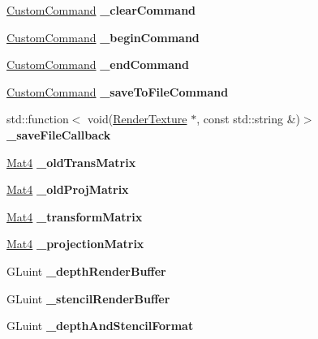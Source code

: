 \begin{DoxyCompactItemize}
\hyperlink{classCustomCommand}{Custom\+Command} {\bfseries \+\_\+clear\+Command}
\item 
\mbox{\label{classRenderTexture_ab05e51044fdc45f4c981eb591fad1737}} 
\hyperlink{classCustomCommand}{Custom\+Command} {\bfseries \+\_\+begin\+Command}
\item 
\mbox{\label{classRenderTexture_affcbad52273936c957acc80c364b7529}} 
\hyperlink{classCustomCommand}{Custom\+Command} {\bfseries \+\_\+end\+Command}
\item 
\mbox{\label{classRenderTexture_a8caea8251c875d0ac7d229243de9dbeb}} 
\hyperlink{classCustomCommand}{Custom\+Command} {\bfseries \+\_\+save\+To\+File\+Command}
\item 
\mbox{\label{classRenderTexture_ad9c6f39e9911934bc3daeee3a31f7bc4}} 
std\+::function$<$ void(\hyperlink{classRenderTexture}{Render\+Texture} $\ast$, const std\+::string \&)$>$ {\bfseries \+\_\+save\+File\+Callback}
\item 
\mbox{\label{classRenderTexture_a1c604661548233695a1bbbf8d99cbe05}} 
\hyperlink{classMat4}{Mat4} {\bfseries \+\_\+old\+Trans\+Matrix}
\item 
\mbox{\label{classRenderTexture_ab2444385a3366ddb8378b7890adff806}} 
\hyperlink{classMat4}{Mat4} {\bfseries \+\_\+old\+Proj\+Matrix}
\item 
\mbox{\label{classRenderTexture_a10db291a52076f6f5f92fdfb7b0b3e1e}} 
\hyperlink{classMat4}{Mat4} {\bfseries \+\_\+transform\+Matrix}
\item 
\mbox{\label{classRenderTexture_a941ea1909c5e223a76bc78efb2cb8e4c}} 
\hyperlink{classMat4}{Mat4} {\bfseries \+\_\+projection\+Matrix}
\item 
\mbox{\label{classRenderTexture_abe76ca2974eae172678820b49ba56b4d}} 
G\+Luint {\bfseries \+\_\+depth\+Render\+Buffer}
\item 
\mbox{\label{classRenderTexture_a8fd54f284ed2b4bed7d83432339c8794}} 
G\+Luint {\bfseries \+\_\+stencil\+Render\+Buffer}
\item 
\mbox{\label{classRenderTexture_a5370882ecb826c8b10aefa898a3d9fdc}} 
G\+Luint {\bfseries \+\_\+depth\+And\+Stencil\+Format}
\end{DoxyCompactItemize}

